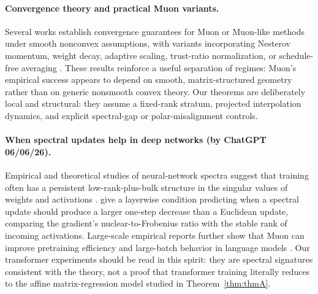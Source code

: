 \documentclass{article}
\begin{document}
\paragraph{Convergence theory and practical Muon variants.}
Several works establish convergence guarantees for Muon or Muon-like methods under smooth nonconvex assumptions, with variants incorporating Nesterov momentum, weight decay, adaptive scaling, trust-ratio normalization, or schedule-free averaging \citep{shen2025convergence,sato2025cbs,si2025adamuon,lou2026orscale,kim2026amuse,cheng2026trasmuon}. These results reinforce a useful separation of regimes: Muon's empirical success appears to depend on smooth, matrix-structured geometry rather than on generic nonsmooth convex theory. Our theorems are deliberately local and structural: they assume a fixed-rank stratum, projected interpolation dynamics, and explicit spectral-gap or polar-misalignment controls.



\paragraph{When spectral updates help in deep networks (by ChatGPT 06/06/26).}
Empirical and theoretical studies of neural-network spectra suggest that training often has a persistent low-rank-plus-bulk structure in the singular values of weights and activations \citep{yunis2024spectral,olsen2025spectra,lauditi2026spectral}. \citep{davis2025spectral} give a layerwise condition predicting when a spectral update should produce a larger one-step decrease than a Euclidean update, comparing the gradient's nuclear-to-Frobenius ratio with the stable rank of incoming activations. Large-scale empirical reports further show that Muon can improve pretraining efficiency and large-batch behavior in language models \citep{essentialai2025practical,liu2025moonlight}. Our transformer experiments should be read in this spirit: they are spectral signatures consistent with the theory, not a proof that transformer training literally reduces to the affine matrix-regression model studied in Theorem~\ref{thm:thmA}.



\end{document}
